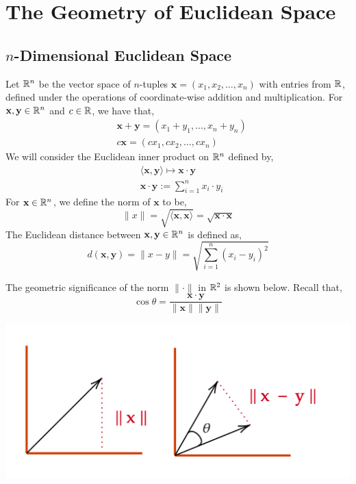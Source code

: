 \section{The Geometry of Euclidean Space}
\subsection{$n$-Dimensional Euclidean Space}
Let $\mathbb{R}^n$ be the vector space of $n$-tuples $\mathbf{x}=\left(x_1, x_2, \ldots, x_n\right)$ with entries from $\mathbb{R}$, defined under the operations of coordinate-wise addition and multiplication. For $\mathbf{x}, \mathbf{y} \in \mathbb{R}^n$ and $c \in \mathbb{R}$, we have that,
\begin{align*}
    &\mathbf{x} + \mathbf{y} = (x_1 + y_1, \ldots, x_n + y_n) \\
    &c \mathbf{x} = \left(c x_1, c x_2, \ldots, c x_n\right)
\end{align*}
We will consider the Euclidean inner product on $\mathbb{R}^n$ defined by,
\begin{align*}
    &\langle\mathbf{x}, \mathbf{y}\rangle \longmapsto \mathbf{x} \cdot \mathbf{y} \\
    &\mathbf{x} \cdot \mathbf{y} := \sum_{i=1}^n x_i \cdot y_i
\end{align*}
For $\mathbf{x} \in \mathbb{R}^n$, we define the norm of $\mathbf{x}$ to be,
\[\|x\| = \sqrt{\langle \mathbf{x}, \mathbf{x}\rangle} =  \sqrt{\mathbf{x} \cdot \mathbf{x}}\]
The Euclidean distance between $\mathbf{x}, \mathbf{y} \in \mathbb{R}^n$ is defined as,
\[d(\mathbf{x}, \mathbf{y}) = \|x - y\| =\sqrt{\sum_{i=1}^n\left(x_i-y_i\right)^2}\]

\begin{marginfigure}
The geometric significance of the norm $\|\cdot\|$ in $\mathbb{R}^2$ is shown below. Recall that,
\[\cos \theta = \frac{\mathbf{x} \cdot \mathbf{y}}{\|\mathbf{x}\|\|\mathbf{y}\|}\]
\begin{center}
       \includegraphics[width=\textwidth]{figures/wk-1/fig-1.png}
\end{center}
\end{marginfigure}

